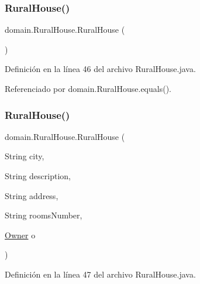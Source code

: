 \subsubsection{\texorpdfstring{RuralHouse()}{RuralHouse()}\hspace{0.1cm}{\footnotesize\ttfamily [1/2]}}
{\footnotesize\ttfamily domain.\+Rural\+House.\+Rural\+House (\begin{DoxyParamCaption}{ }\end{DoxyParamCaption})}



Definición en la línea 46 del archivo Rural\+House.\+java.


\begin{DoxyCode}{0}

\end{DoxyCode}


Referenciado por domain.\+Rural\+House.\+equals().

\mbox{\label{classdomain_1_1_rural_house_a696dcb2f31c1ad66b01f189bb17763df}} 
\subsubsection{\texorpdfstring{RuralHouse()}{RuralHouse()}\hspace{0.1cm}{\footnotesize\ttfamily [2/2]}}
{\footnotesize\ttfamily domain.\+Rural\+House.\+Rural\+House (\begin{DoxyParamCaption}\item[{String}]{city,  }\item[{String}]{description,  }\item[{String}]{address,  }\item[{String}]{rooms\+Number,  }\item[{\mbox{\hyperlink{classdomain_1_1_owner}{Owner}}}]{o }\end{DoxyParamCaption})}



Definición en la línea 47 del archivo Rural\+House.\+java.



